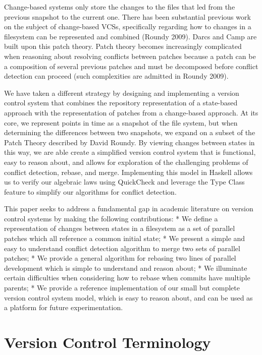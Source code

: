 \documentclass[]{article}
\begin{document}
Change-based systems only store the changes to the files that led from
the previous snapshot to the current one. There has been substantial
previous work on the subject of change-based VCSs, specifically
regarding how to changes in a filesystem can be represented and combined
(Roundy 2009). Darcs and Camp are built upon this patch theory. Patch
theory becomes increasingly complicated when reasoning about resolving
conflicts between patches because a patch can be a composition of
several previous patches and must be decomposed before conflict
detection can proceed (such complexities are admitted in Roundy 2009).

We have taken a different strategy by designing and implementing a
version control system that combines the repository representation of a
state-based approach with the representation of patches from a
change-based approach. At its core, we represent points in time as a
snapshot of the file system, but when determining the differences
between two snapshots, we expand on a subset of the Patch Theory
described by David Roundy. By viewing changes between states in this
way, we are able create a simplified version control system that is
functional, easy to reason about, and allows for exploration of the
challenging problems of conflict detection, rebase, and merge.
Implementing this model in Haskell allows us to verify our algebraic
laws using QuickCheck and leverage the Type Class feature to simplify
our algorithms for conflict detection.

This paper seeks to address a fundamental gap in academic literature on
version control systems by making the following contributions: * We
define a representation of changes between states in a filesystem as a
set of parallel patches which all reference a common initial state; * We
present a simple and easy to understand conflict detection algorithm to
merge two sets of parallel patches; * We provide a general algorithm for
rebasing two lines of parallel development which is simple to understand
and reason about; * We illuminate certain difficulties when considering
how to rebase when commits have multiple parents; * We provide a
reference implementation of our small but complete version control
system model, which is easy to reason about, and can be used as a
platform for future experimentation.

\section{Version Control Terminology}
\end{document}
